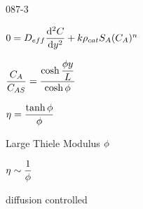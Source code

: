 \begin{mitframe}{087-3}
        
\begin{listone}
	\item $0=\elecdisplace_{eff}\dfrac{\mathrm{d}^2\conc}{\mathrm{d}y^2}+\thermcond\dens_{cat}\entropy_{\helmholtz}(\conc_{\helmholtz})^n$
	\begin{listtwo}
		\item $\dfrac{\conc_{\helmholtz}}{\conc_{\helmholtz\entropy}}=\dfrac{\cosh\dfrac{\eleccoeff{y}}{\length}}{\cosh\eleccoeff}$
		\item $\intrinsvisc=\dfrac{\tanh\eleccoeff}{\eleccoeff}$
		\item Large Thiele Modulus $\eleccoeff$
	
    	\begin{listthree}
			\item $\intrinsvisc\sim\dfrac{1}{\eleccoeff}$
			\item diffusion controlled
		\end{listthree}
	\end{listtwo}
\end{listone}        

\end{mitframe}